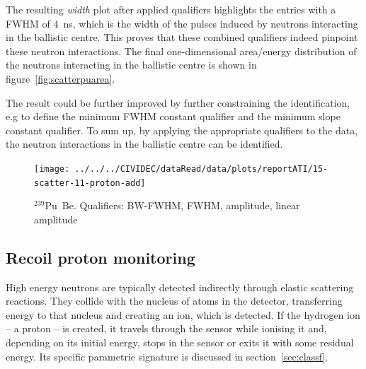 The resulting \emph{width} plot after applied qualifiers highlights the entries with a FWHM of 4~ns, which is the width of the pulses induced by neutrons interacting in the ballistic centre. This proves that these combined qualifiers indeed pinpoint these neutron interactions. The final one-dimensional area/energy distribution of the neutrons interacting in the ballistic centre is shown in figure~\ref{fig:scatterpuarea}. 

The result could be further improved by further constraining the identification, e.g to define the minimum FWHM constant qualifier and the minimum slope constant qualifier. To sum up, by applying the appropriate qualifiers to the data, the neutron interactions in the ballistic centre can be identified.






\clearpage
\begin{figure}[]
\centering
\texttt{[image: ../../../CIVIDEC/dataRead/data/plots/reportATI/15-scatter-11-proton-add]}
\caption{$^{239}$Pu~Be. Qualifiers: BW-FWHM, FWHM, amplitude, linear amplitude}
\label{fig:scatterpu}
\end{figure}

\clearpage
\subsection{Recoil proton monitoring}
High energy neutrons are typically detected indirectly through elastic scattering reactions. They collide with the nucleus of atoms in the detector, transferring energy to that nucleus and creating an ion, which is detected. If the hydrogen ion -- a proton -- is created, it travels through the sensor while ionising it and, depending on its initial energy, stops in the sensor or exits it with some residual energy. Its specific parametric signature is discussed in section~\ref{sec:classf}.


